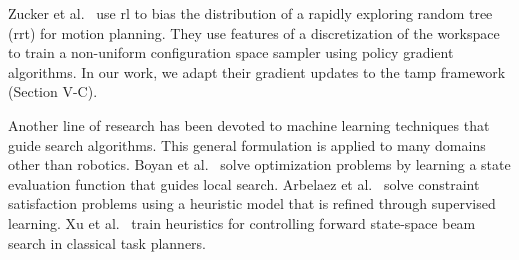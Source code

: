 Zucker et al.~\cite{workspacebias} use {\sc rl} to bias the distribution of a rapidly exploring random tree ({\sc rrt})
for motion planning. They use features of a discretization of the workspace to train
a non-uniform configuration space sampler using policy gradient algorithms.
In our work, we adapt their gradient updates to the {\sc tamp} framework (Section V-C).

Another line of research has been devoted to machine learning techniques that
guide search algorithms. This general formulation is applied to many domains other than robotics.
Boyan et al.~\cite{Boyanlearning} solve optimization problems by learning a state
evaluation function that guides local search. Arbelaez et al.~\cite{hamadisearch} solve constraint
satisfaction problems using a heuristic model that is refined through supervised learning.
Xu et al.~\cite{Xu07discriminativelearning} train heuristics for controlling forward
state-space beam search in classical task planners.



